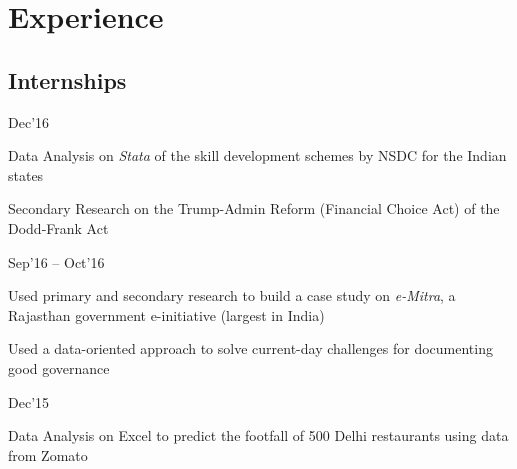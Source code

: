 \documentclass[]{deedy-resume-openfont}
\begin{document}
\hfill
\begin{minipage}[t]{0.66\textwidth} 


\section{Experience}

\subsection{Internships}

\descript{|}
\hfill Dec'16\\
\vspace{\topsep}
\begin{tightemize}
\item Data Analysis on \emph{Stata} of the skill development schemes by NSDC for the Indian states
\item Secondary Research on the Trump-Admin Reform (Financial Choice Act) of the Dodd-Frank Act
\end{tightemize}
\vspace{0.2em}

\descript{|}
\hfill Sep'16 -- Oct'16\\
\begin{tightemize}
\item Used primary and secondary research to build a case study on \emph{e-Mitra}, a Rajasthan government e-initiative (largest in India)
\item Used a data-oriented approach to solve current-day challenges for documenting good governance
\end{tightemize}
\vspace{0.2em}

\descript{|}
\hfill Dec'15\\
\begin{tightemize}
\item Data Analysis on Excel to predict the footfall of 500 Delhi restaurants using data from Zomato
\end{tightemize}
\vspace{0.2em}


\end{minipage}
\end{document}
